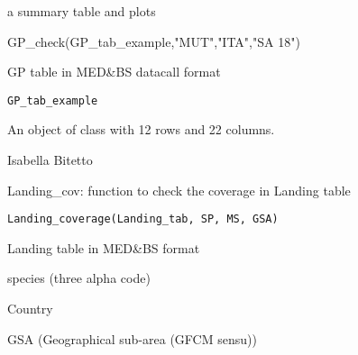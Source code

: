 \documentclass[a4paper]{book}
\begin{document}
%
\begin{Value}
a summary table and plots
\end{Value}
%
\begin{Examples}
\begin{ExampleCode}
GP_check(GP_tab_example,"MUT","ITA","SA 18")
\end{ExampleCode}
\end{Examples}
%
\begin{Description}\relax
GP table in MED\&BS datacall format
\end{Description}
%
\begin{Usage}
\begin{verbatim}
GP_tab_example
\end{verbatim}
\end{Usage}
%
\begin{Format}
An object of class  with 12 rows and 22 columns.
\end{Format}
%
\begin{Author}\relax
Isabella Bitetto 
\end{Author}
%
\begin{Description}\relax
Landing\_cov: function to check the coverage in Landing table
\end{Description}
%
\begin{Usage}
\begin{verbatim}
Landing_coverage(Landing_tab, SP, MS, GSA)
\end{verbatim}
\end{Usage}
%
\begin{Arguments}
\begin{ldescription}
\item[\code{Landing\_tab}] Landing table in MED\&BS format

\item[\code{SP}] species (three alpha code)

\item[\code{MS}] Country

\item[\code{GSA}] GSA (Geographical sub-area (GFCM sensu))
\end{ldescription}
\end{Arguments}
\end{document}
